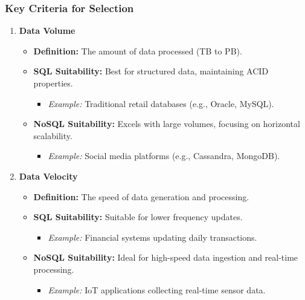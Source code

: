 \documentclass[aspectratio=169]{beamer}
\begin{document}
\begin{frame}[fragile]
    \frametitle{Key Criteria for Selection}
    \begin{enumerate}
        \item \textbf{Data Volume}
            \begin{itemize}
                \item \textbf{Definition:} The amount of data processed (TB to PB).
                \item \textbf{SQL Suitability:} Best for structured data, maintaining ACID properties.
                    \begin{itemize}
                        \item \textit{Example:} Traditional retail databases (e.g., Oracle, MySQL).
                    \end{itemize}
                \item \textbf{NoSQL Suitability:} Excels with large volumes, focusing on horizontal scalability.
                    \begin{itemize}
                        \item \textit{Example:} Social media platforms (e.g., Cassandra, MongoDB).
                    \end{itemize}
            \end{itemize}
            
        \item \textbf{Data Velocity}
            \begin{itemize}
                \item \textbf{Definition:} The speed of data generation and processing.
                \item \textbf{SQL Suitability:} Suitable for lower frequency updates.
                    \begin{itemize}
                        \item \textit{Example:} Financial systems updating daily transactions.
                    \end{itemize}
                \item \textbf{NoSQL Suitability:} Ideal for high-speed data ingestion and real-time processing.
                    \begin{itemize}
                        \item \textit{Example:} IoT applications collecting real-time sensor data.
                    \end{itemize}
            \end{itemize}
          

\end{enumerate}
\end{frame}
\end{document}
